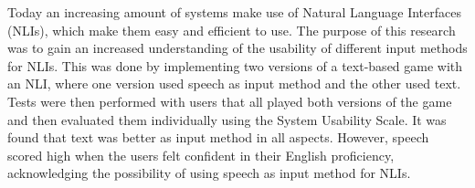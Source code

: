 Today an increasing amount of systems make use of Natural Language Interfaces (NLIs), which make them easy and efficient to use. The purpose of this research was to gain an increased understanding of the usability of different input methods for NLIs. This was done by implementing two versions of a text-based game with an NLI, where one version used speech as input method and the other used text. Tests were then performed with users that all played both versions of the game and then evaluated them individually using the System Usability Scale. It was found that text was better as input method in all aspects. However, speech scored high when the users felt confident in their English proficiency, acknowledging the possibility of using speech as input method for NLIs.

